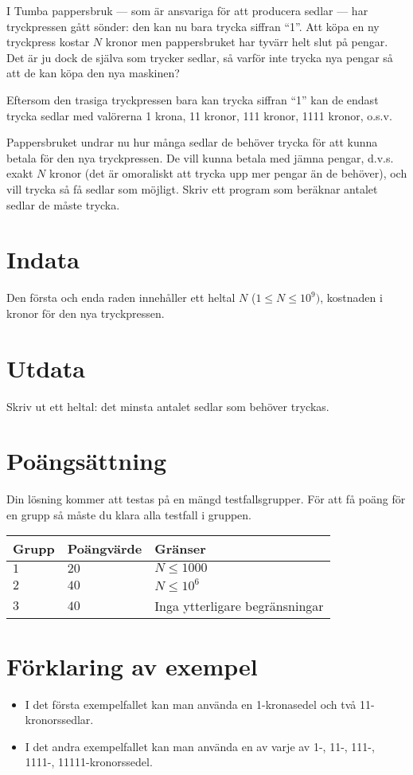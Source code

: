 I Tumba pappersbruk --- som är ansvariga för att producera sedlar --- har tryckpressen gått sönder: den kan nu bara trycka siffran ``1''.
Att köpa en ny tryckpress kostar $N$ kronor men pappersbruket har tyvärr helt slut på pengar.
Det är ju dock de själva som trycker sedlar, så varför inte trycka nya pengar så att de kan köpa den nya maskinen?

Eftersom den trasiga tryckpressen bara kan trycka siffran ``1'' kan de endast trycka sedlar med valörerna 1 krona, 11 kronor, 111 kronor, 1111 kronor, o.s.v.

Pappersbruket undrar nu hur många sedlar de behöver trycka för att kunna betala för den nya tryckpressen.
De vill kunna betala med jämna pengar, d.v.s. exakt $N$ kronor (det är omoraliskt att trycka upp mer pengar än de behöver), och vill trycka så få sedlar som möjligt.
Skriv ett program som beräknar antalet sedlar de måste trycka.

\section*{Indata}
Den första och enda raden innehåller ett heltal $N$ ($1 \le N \le 10^9)$, kostnaden i kronor för den nya tryckpressen.

\section*{Utdata}
Skriv ut ett heltal: det minsta antalet sedlar som behöver tryckas.

\section*{Poängsättning}
Din lösning kommer att testas på en mängd testfallsgrupper.
För att få poäng för en grupp så måste du klara alla testfall i gruppen.

\noindent
\begin{tabular}{| l | l | l |}
  \hline
  Grupp & Poängvärde & Gränser \\ \hline
  $1$    & $20$        &  $ N \leq 1000 $ \\ \hline 
  $2$    & $40$        &  $ N \leq 10^6 $ \\ \hline
  $3$    & $40$        &  Inga ytterligare begränsningar \\ \hline
\end{tabular}

\section*{Förklaring av exempel}
\begin{itemize}
  \item I det första exempelfallet kan man använda en 1-kronasedel och två 11-kronorssedlar.
  \item I det andra exempelfallet kan man använda en av varje av 1-, 11-, 111-, 1111-, 11111-kronorssedel.
\end{itemize}
